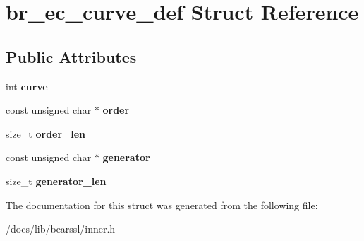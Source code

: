 \hypertarget{structbr__ec__curve__def}{}\section{br\+\_\+ec\+\_\+curve\+\_\+def Struct Reference}
\label{structbr__ec__curve__def}
\subsection*{Public Attributes}
\begin{DoxyCompactItemize}
\item 
\mbox{\label{structbr__ec__curve__def_ac8be580f8b0cc720e0769d5c83efcc7d}} 
int {\bfseries curve}
\item 
\mbox{\label{structbr__ec__curve__def_abab91e048a470c9307dc709456bd175c}} 
const unsigned char $\ast$ {\bfseries order}
\item 
\mbox{\label{structbr__ec__curve__def_acc9d4a8a15a82319e470202433fd390d}} 
size\+\_\+t {\bfseries order\+\_\+len}
\item 
\mbox{\label{structbr__ec__curve__def_a161602ba207115ae41304e2b9963ceb0}} 
const unsigned char $\ast$ {\bfseries generator}
\item 
\mbox{\label{structbr__ec__curve__def_ad1a92747e9528625d98eb8f22b78e678}} 
size\+\_\+t {\bfseries generator\+\_\+len}
\end{DoxyCompactItemize}


The documentation for this struct was generated from the following file\+:\begin{DoxyCompactItemize}
\item 
/docs/lib/bearssl/inner.\+h\end{DoxyCompactItemize}
